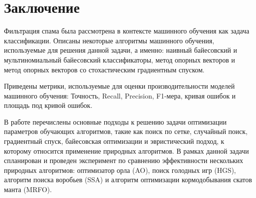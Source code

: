 \chapter*{Заключение}

Фильтрация спама была рассмотрена в контексте машинного обучения как задача
классификации. Описаны некоторые алгоритмы машинного обучения, используемые 
для решения данной задачи, а именно: наивный байесовский и мультиномиальный байесовский 
классификаторы, метод опорных векторов и метод опорных векторов со стохастическим градиентным спуском. 

Приведены метрики, используемые для оценки производительности
моделей машинного обучения: Точность, Recall, Precision, F1-мера, кривая ошибок и площадь под кривой ошибок. 

В работе перечислены основные подходы к решению задачи оптимизации параметров
обучающих алгоритмов, такие как поиск по сетке, случайный поиск, градиентный спуск, байесовская 
оптимизации и эвристический подход, к которому относится применение природных алгоритмов.
В рамках данной задачи спланирован и проведен эксперимент по сравнению 
эффективности нескольких природных алгоритмов: оптимизатор орла (AO), поиск голодных игр (HGS), алгоритм поиска 
воробьев (SSA) и алгоритм оптимизации кормодобывания скатов манта (MRFO).

